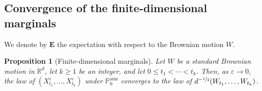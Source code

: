 \documentclass[11pt]{amsart}
\newtheorem{proposition}[theorem]{Proposition}
\numberwithin{equation}{section}
\newcommand{\R}{\mathbb{R}}
\newcommand{\PP}{\mathbb{P}}
\newcommand{\eps}{\varepsilon}
\newcommand{\nf}{\nicefrac}
\begin{document}
\subsection{Convergence of the finite-dimensional marginals} \label{sec:fdd}

We denote by $\mathbf{E}$ the expectation with respect to the Brownian motion $W$.

\begin{proposition}[Finite-dimensional marginals] \label{prop:fdd}
Let $W$ be a standard Brownian motion in $\R^d$, let $k \geq 1$ be an integer, and let $0 \leq t_1 < \cdots < t_k$.
Then, as $\eps \to 0$, the law of $(X^{\eps}_{t_1}, \ldots, X^{\eps}_{t_k})$ under $\PP^{\mathrm{ann}}_0$ converges to the law of $d^{-\nf12} (W_{t_1}, \ldots, W_{t_k})$.
\end{proposition}
\end{document}

